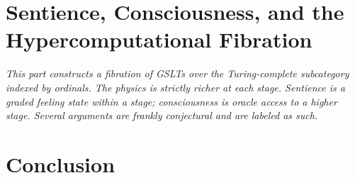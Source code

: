 \documentclass[12pt,openright,twoside]{book}
\theoremstyle{remark}
\begin{document}
\bigskip


\part{Sentience, Consciousness, and the Hypercomputational Fibration}

\vspace{1em}
\begin{mdframed}[backgroundcolor=remarkgray, linecolor=gray!60,
                 linewidth=1pt, topline=false, rightline=false,
                 bottomline=false]
\small\itshape
This part constructs a fibration of GSLTs over the Turing-complete
subcategory indexed by ordinals.
The physics is strictly richer at each stage.
Sentience is a graded feeling state within a stage;
consciousness is oracle access to a higher stage.
Several arguments are frankly conjectural and are labeled as such.
\end{mdframed}

\bigskip


\part*{Conclusion}
\end{document}
